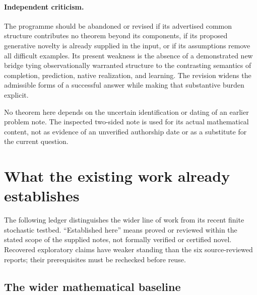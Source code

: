 \documentclass[11pt]{article}
\theoremstyle{remark}
\begin{document}
\paragraph{Independent criticism.}
The programme should be abandoned or revised if its advertised common structure contributes no theorem beyond its components, if its proposed generative novelty is already supplied in the input, or if its assumptions remove all difficult examples. Its present weakness is the absence of a demonstrated new bridge tying observationally warranted structure to the contrasting semantics of completion, prediction, native realization, and learning. The revision widens the admissible forms of a successful answer while making that substantive burden explicit.

No theorem here depends on the uncertain identification or dating of an earlier problem note. The inspected two-sided note is used for its actual mathematical content, not as evidence of an unverified authorship date or as a substitute for the current question.

\section{What the existing work already establishes}
\label{sec:ledger}

The following ledger distinguishes the wider line of work from its recent finite stochastic testbed. ``Established here'' means proved or reviewed within the stated scope of the supplied notes, not formally verified or certified novel. Recovered exploratory claims have weaker standing than the six source-reviewed reports; their prerequisites must be rechecked before reuse.

\subsection{The wider mathematical baseline}
\end{document}
